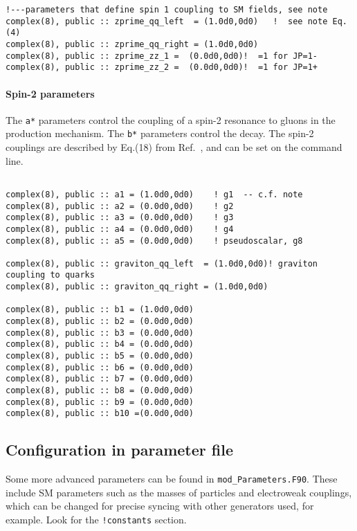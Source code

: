 \documentclass[aps,superscriptaddress,nofootinbib]{revtex4}
\begin{document}
\begin{verbatim}
!---parameters that define spin 1 coupling to SM fields, see note
complex(8), public :: zprime_qq_left  = (1.0d0,0d0)   !  see note Eq. (4)
complex(8), public :: zprime_qq_right = (1.0d0,0d0)
complex(8), public :: zprime_zz_1 =  (0.0d0,0d0)!  =1 for JP=1-
complex(8), public :: zprime_zz_2 =  (0.0d0,0d0)!  =1 for JP=1+
\end{verbatim}

\paragraph{Spin-2 parameters}
\label{spin2}

\noindent
The \verb|a*| parameters control the coupling of a spin-2 resonance to gluons in the production mechanism.  The \verb|b*| parameters control the decay.
The spin-2 couplings are described by Eq.(18) from Ref.~\cite{Bolognesi:2012}, and can be set on the command line.

\begin{verbatim}

complex(8), public :: a1 = (1.0d0,0d0)    ! g1  -- c.f. note
complex(8), public :: a2 = (0.0d0,0d0)    ! g2
complex(8), public :: a3 = (0.0d0,0d0)    ! g3
complex(8), public :: a4 = (0.0d0,0d0)    ! g4
complex(8), public :: a5 = (0.0d0,0d0)    ! pseudoscalar, g8

complex(8), public :: graviton_qq_left  = (1.0d0,0d0)! graviton coupling to quarks
complex(8), public :: graviton_qq_right = (1.0d0,0d0)

complex(8), public :: b1 = (1.0d0,0d0)
complex(8), public :: b2 = (0.0d0,0d0)
complex(8), public :: b3 = (0.0d0,0d0)
complex(8), public :: b4 = (0.0d0,0d0)
complex(8), public :: b5 = (0.0d0,0d0)
complex(8), public :: b6 = (0.0d0,0d0)
complex(8), public :: b7 = (0.0d0,0d0)
complex(8), public :: b8 = (0.0d0,0d0)
complex(8), public :: b9 = (0.0d0,0d0)
complex(8), public :: b10 =(0.0d0,0d0)
\end{verbatim}

\subsection{Configuration in parameter file }

Some more advanced parameters can be found in \verb|mod_Parameters.F90|.  These include SM parameters such as the masses of particles and electroweak couplings, which can be changed for precise syncing with other generators used, for example.  Look for the \verb|!constants| section.
\end{document}
